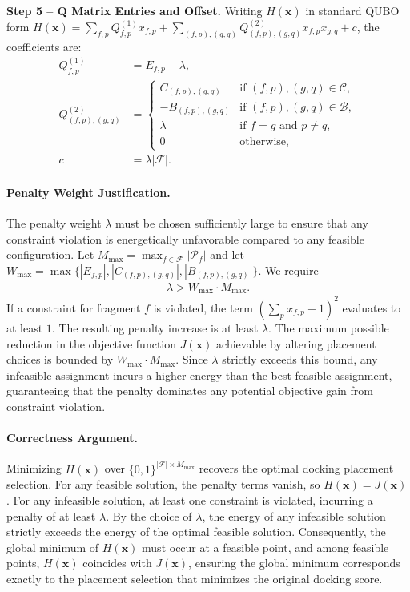 \documentclass[12pt]{article}
\begin{document}
\textbf{Step 5 -- Q Matrix Entries and Offset.}
Writing $H(\mathbf{x})$ in standard QUBO form $H(\mathbf{x}) = \sum_{f,p} Q_{f,p}^{(1)} x_{f,p} + \sum_{(f,p),(g,q)} Q_{(f,p),(g,q)}^{(2)} x_{f,p} x_{g,q} + c$, the coefficients are:
\begin{align}
Q_{f,p}^{(1)} &= E_{f,p} - \lambda, \\
Q_{(f,p),(g,q)}^{(2)} &= 
\begin{cases}
C_{(f,p),(g,q)} & \text{if } (f,p),(g,q) \in \mathcal{C}, \\
-B_{(f,p),(g,q)} & \text{if } (f,p),(g,q) \in \mathcal{B}, \\
\lambda & \text{if } f = g \text{ and } p \neq q, \\
0 & \text{otherwise},
\end{cases} \\
c &= \lambda |\mathcal{F}|.
\end{align}

\paragraph{Penalty Weight Justification.}
The penalty weight $\lambda$ must be chosen sufficiently large to ensure that any constraint violation is energetically unfavorable compared to any feasible configuration. Let $M_{\max} = \max_{f \in \mathcal{F}} |\mathcal{P}_f|$ and let $W_{\max} = \max \{ |E_{f,p}|, |C_{(f,p),(g,q)}|, |B_{(f,p),(g,q)}| \}$. We require
\begin{align}
\lambda > W_{\max} \cdot M_{\max}.
\end{align}
If a constraint for fragment $f$ is violated, the term $\left( \sum_{p} x_{f,p} - 1 \right)^2$ evaluates to at least $1$. The resulting penalty increase is at least $\lambda$. The maximum possible reduction in the objective function $J(\mathbf{x})$ achievable by altering placement choices is bounded by $W_{\max} \cdot M_{\max}$. Since $\lambda$ strictly exceeds this bound, any infeasible assignment incurs a higher energy than the best feasible assignment, guaranteeing that the penalty dominates any potential objective gain from constraint violation.

\paragraph{Correctness Argument.}
Minimizing $H(\mathbf{x})$ over $\{0,1\}^{|\mathcal{F}| \times M_{\max}}$ recovers the optimal docking placement selection. For any feasible solution, the penalty terms vanish, so $H(\mathbf{x}) = J(\mathbf{x})$. For any infeasible solution, at least one constraint is violated, incurring a penalty of at least $\lambda$. By the choice of $\lambda$, the energy of any infeasible solution strictly exceeds the energy of the optimal feasible solution. Consequently, the global minimum of $H(\mathbf{x})$ must occur at a feasible point, and among feasible points, $H(\mathbf{x})$ coincides with $J(\mathbf{x})$, ensuring the global minimum corresponds exactly to the placement selection that minimizes the original docking score.
\end{document}
